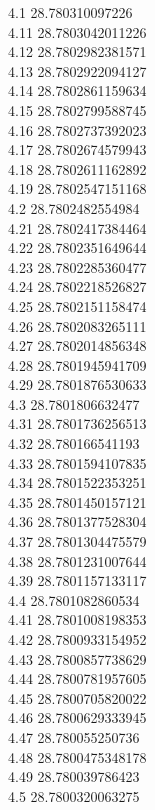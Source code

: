 {4.1	28.780310097226\\
4.11	28.7803042011226\\
4.12	28.7802982381571\\
4.13	28.7802922094127\\
4.14	28.7802861159634\\
4.15	28.7802799588745\\
4.16	28.7802737392023\\
4.17	28.7802674579943\\
4.18	28.7802611162892\\
4.19	28.7802547151168\\
4.2	28.7802482554984\\
4.21	28.7802417384464\\
4.22	28.7802351649644\\
4.23	28.7802285360477\\
4.24	28.7802218526827\\
4.25	28.7802151158474\\
4.26	28.7802083265111\\
4.27	28.7802014856348\\
4.28	28.7801945941709\\
4.29	28.7801876530633\\
4.3	28.7801806632477\\
4.31	28.7801736256513\\
4.32	28.780166541193\\
4.33	28.7801594107835\\
4.34	28.7801522353251\\
4.35	28.7801450157121\\
4.36	28.7801377528304\\
4.37	28.7801304475579\\
4.38	28.7801231007644\\
4.39	28.7801157133117\\
4.4	28.7801082860534\\
4.41	28.7801008198353\\
4.42	28.7800933154952\\
4.43	28.7800857738629\\
4.44	28.7800781957605\\
4.45	28.7800705820022\\
4.46	28.7800629333945\\
4.47	28.780055250736\\
4.48	28.7800475348178\\
4.49	28.780039786423\\
4.5	28.7800320063275\\
}

